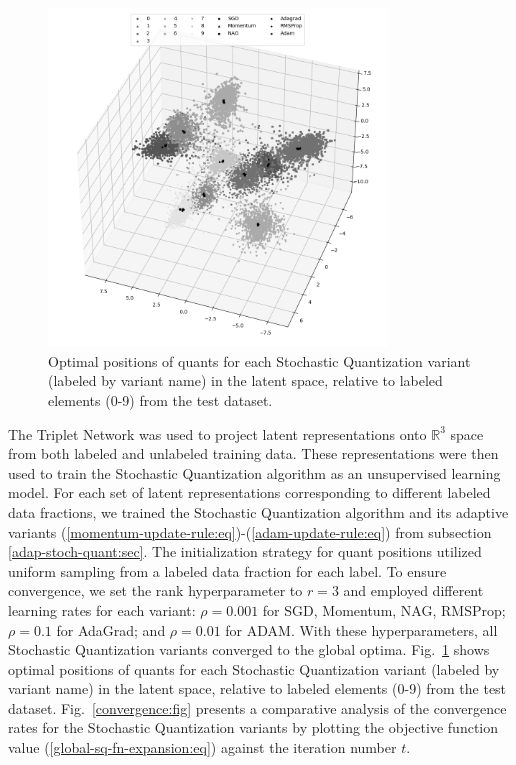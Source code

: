 \begin{figure}
    \centering
    \includegraphics[width=0.8\textwidth]{figures/sq_quants.png}
    \caption{Optimal positions of quants for each Stochastic Quantization variant (labeled by variant name) in the latent space, relative to labeled elements (0-9) from the test dataset.}
    \label{quants:fig}
\end{figure}

The Triplet Network was used to project latent representations onto $\mathbb{R}^3$ space from both labeled and unlabeled training data. These representations were then used to train the Stochastic Quantization algorithm as an unsupervised learning model. For each set of latent representations corresponding to different labeled data fractions, we trained the Stochastic Quantization algorithm and its adaptive variants (\ref{momentum-update-rule:eq})-(\ref{adam-update-rule:eq}) from subsection \ref{adap-stoch-quant:sec}. The initialization strategy for quant positions utilized uniform sampling from a labeled data fraction for each label. To ensure convergence, we set the rank hyperparameter to $r = 3$ and employed different learning rates for each variant: $\rho = 0.001$ for SGD, Momentum, NAG, RMSProp; $\rho = 0.1$ for AdaGrad; and $\rho = 0.01$ for ADAM. With these hyperparameters, all Stochastic Quantization variants converged to the global optima. Fig.~\ref{quants:fig} shows optimal positions of quants for each Stochastic Quantization variant (labeled by variant name) in the latent space, relative to labeled elements (0-9) from the test dataset. Fig.~\ref{convergence:fig} presents a comparative analysis of the convergence rates for the Stochastic Quantization variants by plotting the objective function value (\ref{global-sq-fn-expansion:eq}) against the iteration number $t$.

